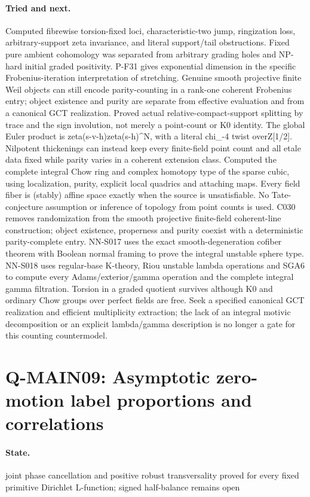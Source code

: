 \paragraph{Tried and next.} Computed fibrewise torsion-fixed loci, characteristic-two jump, ringization loss, arbitrary-support zeta invariance, and literal support/tail obstructions. Fixed pure ambient cohomology was separated from arbitrary grading holes and NP-hard initial graded positivity. P-F31 gives exponential dimension in the specific Frobenius-iteration interpretation of stretching. Genuine smooth projective finite Weil objects can still encode parity-counting in a rank-one coherent Frobenius entry; object existence and purity are separate from effective evaluation and from a canonical GCT realization. Proved actual relative-compact-support splitting by trace and the sign involution, not merely a point-count or K0 identity. The global Euler product is zeta(s-v-h)zeta(s-h)\textasciicircum{}N, with a literal chi\_-4 twist overZ[1/2]. Nilpotent thickenings can instead keep every finite-field point count and all etale data fixed while parity varies in a coherent extension class. Computed the complete integral Chow ring and complex homotopy type of the sparse cubic, using localization, purity, explicit local quadrics and attaching maps. Every field fiber is (stably) affine space exactly when the source is unsatisfiable. No Tate-conjecture assumption or inference of topology from point counts is used. C030 removes randomization from the smooth projective finite-field coherent-line construction; object existence, properness and purity coexist with a deterministic parity-complete entry. NN-S017 uses the exact smooth-degeneration cofiber theorem with Boolean normal framing to prove the integral unstable sphere type. NN-S018 uses regular-base K-theory, Riou unstable lambda operations and SGA6 to compute every Adams/exterior/gamma operation and the complete integral gamma filtration. Torsion in a graded quotient survives although K0 and ordinary Chow groups over perfect fields are free. Seek a specified canonical GCT realization and efficient multiplicity extraction; the lack of an integral motivic decomposition or an explicit lambda/gamma description is no longer a gate for this counting countermodel.

\section{Q-MAIN09: Asymptotic zero-motion label proportions and correlations}
\paragraph{State.} joint phase cancellation and positive robust transversality proved for every fixed primitive Dirichlet L-function; signed half-balance remains open
